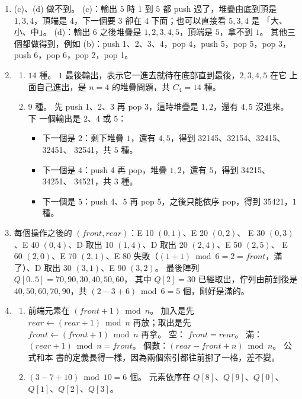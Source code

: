 \begin{enumerate}
\item (c)、(d) 做不到。 (c)：輸出 $5$ 時 $1$ 到 $5$ 都 push 過了，堆疊由底到頂是
$1, 3, 4$，頂端是 $4$，下一個要 $3$ 卻在 $4$ 下面；也可以直接看 $5, 3, 4$ 是
「大、小、中」。 (d)：輸出 $6$ 之後堆疊是 $1, 2, 3, 4, 5$，頂端是 $5$，拿不到
$1$。 其他三個都做得到，例如 (b)：push 1、2、3、4，pop 4，push 5，pop 5，pop 3，
push 6，pop 6，pop 2，pop 1。

\item
\begin{enumerate}
\item $14$ 種。 $1$ 最後輸出，表示它一進去就待在底部直到最後，$2, 3, 4, 5$ 在它
上面自己進出，是 $n = 4$ 的堆疊問題，共 $C_4 = 14$ 種。
\item $9$ 種。 先 push 1、2、3 再 pop 3，這時堆疊是 $1, 2$，還有 $4, 5$ 沒進來。 下
一個輸出是 $2$、$4$ 或 $5$：
\begin{itemize}
\item 下一個是 $2$：剩下堆疊 $1$，還有 $4, 5$，得到 32145、32154、32415、32451、
32541，共 $5$ 種。
\item 下一個是 $4$：push 4 再 pop，堆疊 $1, 2$，還有 $5$，得到 34215、34251、
34521，共 $3$ 種。
\item 下一個是 $5$：push 4、5 再 pop 5，之後只能依序 pop，得到 35421，$1$ 種。
\end{itemize}
\end{enumerate}

\item 每個操作之後的 $(\mathit{front}, \mathit{rear})$：E 10 $(0,1)$、E 20 $(0,2)$、
E 30 $(0,3)$、E 40 $(0,4)$、D 取出 10 $(1,4)$、D 取出 20 $(2,4)$、E 50 $(2,5)$、
E 60 $(2,0)$、E 70 $(2,1)$、E 80 失敗（$(1 + 1) \bmod 6 = 2 = \mathit{front}$，滿
了）、D 取出 30 $(3,1)$、E 90 $(3,2)$。 最後陣列 $Q[0..5] = 70, 90, 30, 40, 50, 60$，
其中 $Q[2] = 30$ 已經取出，佇列由前到後是 $40, 50, 60, 70, 90$，共
$(2 - 3 + 6) \bmod 6 = 5$ 個，剛好是滿的。

\item
\begin{enumerate}
\item 前端元素在 $(\mathit{front} + 1) \bmod n$。 加入是先
$\mathit{rear} \gets (\mathit{rear} + 1) \bmod n$ 再放；取出是先
$\mathit{front} \gets (\mathit{front} + 1) \bmod n$ 再拿。 空：
$\mathit{front} = \mathit{rear}$。 滿：$(\mathit{rear} + 1) \bmod n =
\mathit{front}$。 個數：$(\mathit{rear} - \mathit{front} + n) \bmod n$。 公式和本
書的定義長得一樣，因為兩個索引都往前挪了一格，差不變。
\item $(3 - 7 + 10) \bmod 10 = 6$ 個。 元素依序在 $Q[8]$、$Q[9]$、$Q[0]$、
$Q[1]$、$Q[2]$、$Q[3]$。
\end{enumerate}


\end{enumerate}
